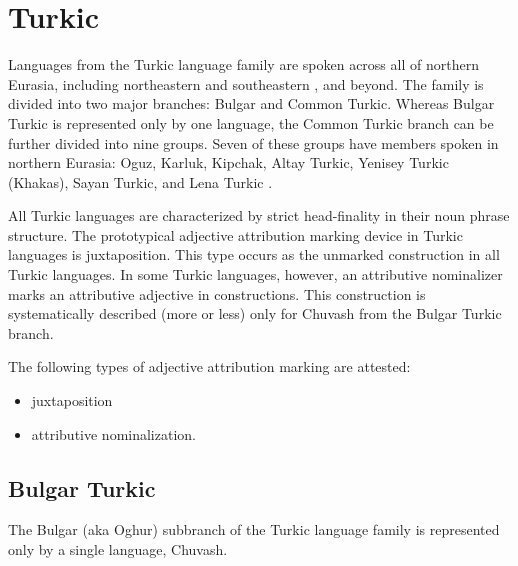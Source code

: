 \section{Turkic}
Languages from the Turkic language family are spoken across all of northern Eurasia, including northeastern and southeastern , and beyond. The family is divided into two major branches: Bulgar and Common Turkic. Whereas Bulgar Turkic is represented only by one language, the Common Turkic branch can be further divided into nine groups. Seven of these groups have members spoken in northern Eurasia: Oguz, Karluk, Kipchak, Altay Turkic, Yenisey Turkic (Khakas), Sayan Turkic, and Lena Turkic \citep[221]{salminen2007}.

All Turkic languages are characterized by strict head-finality in their noun phrase structure. The prototypical adjective attribution marking device in Turkic languages is juxtaposition. This type occurs as the unmarked construction in all Turkic languages. In some Turkic languages, however, an attributive nominalizer marks an attributive adjective in  constructions. This construction is systematically described (more or less) only for Chuvash from the Bulgar Turkic branch.

The following types of adjective attribution marking are attested:
\begin{itemize}
\item juxtaposition
\item attributive nominalization.
\end{itemize}

\subsection{Bulgar Turkic}
The Bulgar (aka Oghur) subbranch of the Turkic language family is represented only by a single language, Chuvash.

